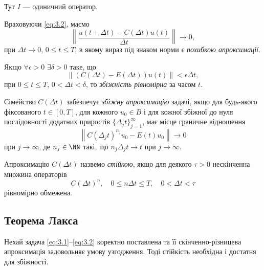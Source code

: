Тут $I$ --- одиничний оператор.

\begin{definition}
    Враховуючи \eqref{eq:3.2}, маємо
    \begin{equation}
        \label{eq:3.6b}
        \left\| \frac{u(t + \Delta t) - C(\Delta t) u(t)}{\Delta t} \right\| \to 0,
    \end{equation}
    при $\Delta t \to 0$, $0 \le t \le T$, в якому вираз під знаком норми є \textit{похибкою апроксимації}.
\end{definition}

Якщо $\forall \epsilon > 0$ $\exists \delta > 0$ таке, що 
\begin{equation}
    \label{eq:3.6c}
    \left\| \left( C(\Delta t) - E(\Delta t) \right) u(t) \right\| < \epsilon \Delta t,
\end{equation}
при $0 \le t \le T$, $0 < \Delta t < \delta$, то \textit{збіжність рівномірна} за часом $t$.

\begin{definition}
    Сімейство $C(\Delta t)$ забезпечує \textit{збіжну апроксимацію} задачі, якщо для будь-якого фіксованого $t \in [0, T]$, для кожного $u_0 \in B$ і для кожної збіжної до нуля послідовності додатних приростів $\{\Delta_j t\}_{j = 1}^\infty$, має місце граничне відношення 
    \begin{equation}
        \label{eq:3.7}
        \left\| C(\Delta_j t)^{n_j} u_0 - E(t) u_0 \right\| \to 0
    \end{equation}
    при $j \to \infty$, де $n_j \in \NN$ такі, що $n_j \Delta_j t \to t$ при $j \to \infty$.
\end{definition}

\begin{definition}
    Апроксимацію $C(\Delta t)$ назвемо \textit{стійкою}, якщо для деякого $\tau > 0$ нескінченна множина операторів 
    \begin{equation}
        \label{eq:3.9}
        C(\Delta t)^n, \quad 0 \le n \Delta t \le T, \quad 0 < \Delta t < \tau
    \end{equation}
    рівномірно обмежена. 
\end{definition}

\subsection{Теорема Лакса}

\begin{theorem}
    Нехай задача \eqref{eq:3.1}--\eqref{eq:3.2} коректно поставлена та її скінченно-різницева апроксимація задовольняє умову узгодження. Тоді стійкість необхідна і достатня для збіжності.
\end{theorem}

